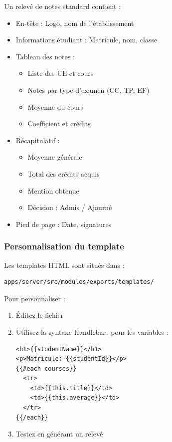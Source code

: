 Un relevé de notes standard contient :
\begin{itemize}[leftmargin=*]
    \item En-tête : Logo, nom de l'établissement
    \item Informations étudiant : Matricule, nom, classe
    \item Tableau des notes :
    \begin{itemize}
        \item Liste des UE et cours
        \item Notes par type d'examen (CC, TP, EF)
        \item Moyenne du cours
        \item Coefficient et crédits
    \end{itemize}
    \item Récapitulatif :
    \begin{itemize}
        \item Moyenne générale
        \item Total des crédits acquis
        \item Mention obtenue
        \item Décision : Admis / Ajourné
    \end{itemize}
    \item Pied de page : Date, signatures
\end{itemize}


\subsubsection{Personnalisation du template}

Les templates HTML sont situés dans :
\begin{lstlisting}[frame=single]
apps/server/src/modules/exports/templates/
\end{lstlisting}

Pour personnaliser :
\begin{enumerate}[leftmargin=*]
    \item Éditez le fichier 
    \item Utilisez la syntaxe Handlebars pour les variables :
    \begin{lstlisting}[language={}, frame=single, basicstyle=\small\ttfamily]
<h1>{{studentName}}</h1>
<p>Matricule: {{studentId}}</p>
{{#each courses}}
  <tr>
    <td>{{this.title}}</td>
    <td>{{this.average}}</td>
  </tr>
{{/each}}
    \end{lstlisting}
    \item Testez en générant un relevé
\end{enumerate}

